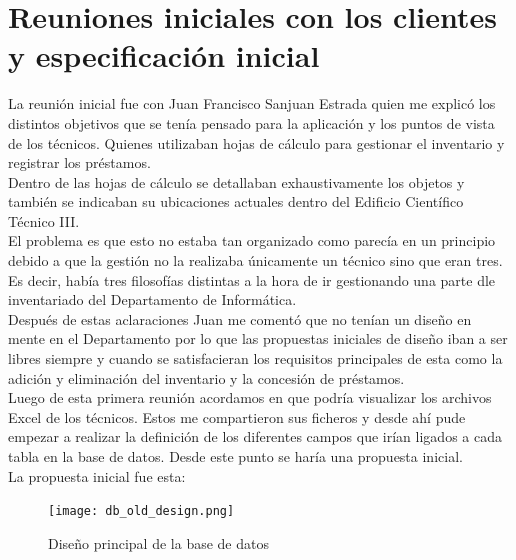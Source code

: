 \section{Reuniones iniciales con los clientes y especificación inicial}

La reunión inicial fue con Juan Francisco Sanjuan Estrada quien me explicó los distintos objetivos que se tenía pensado para la aplicación y los puntos de vista de los técnicos. Quienes utilizaban hojas de cálculo para gestionar el inventario y registrar los préstamos.
\\Dentro de las hojas de cálculo se detallaban exhaustivamente los objetos y también se indicaban su ubicaciones actuales dentro del Edificio Científico Técnico III.
\\El problema es que esto no estaba tan organizado como parecía en un principio debido a que la gestión no la realizaba únicamente un técnico sino que eran tres. Es decir, había tres filosofías distintas a la hora de ir gestionando una parte dle inventariado del Departamento de Informática.
\\Después de estas aclaraciones Juan me comentó que no tenían un diseño en mente en el Departamento por lo que las propuestas iniciales de diseño iban a ser libres siempre y cuando se satisfacieran los requisitos principales de esta como la adición y eliminación del inventario y la concesión de préstamos.
\vspace{\baselineskip}
\\Luego de esta primera reunión acordamos en que podría visualizar los archivos Excel de los técnicos. Estos me compartieron sus ficheros y desde ahí pude empezar a realizar la definición de los diferentes campos que irían ligados a cada tabla en la base de datos. Desde este punto se haría una propuesta inicial.
\\La propuesta inicial fue esta:

\begin{figure}
    \texttt{[image: db\_old\_design.png]}
    \caption{Diseño principal de la base de datos}
\end{figure}

